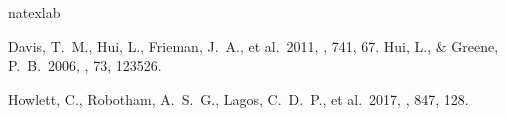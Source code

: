 \documentclass{aastex62}   	%
\begin{document}
\begin{thebibliography}{}
\expandafter\ifx\csname natexlab\endcsname\relax\def\natexlab#1{#1}\fi
\providecommand{\url}[1]{\href{#1}{#1}}
\providecommand{\dodoi}[1]{doi:~\href{http://doi.org/#1}{\nolinkurl{#1}}}
\providecommand{\doeprint}[1]{\href{http://ascl.net/#1}{\nolinkurl{http://ascl.net/#1}}}
\providecommand{\doarXiv}[1]{\href{https://arxiv.org/abs/#1}{\nolinkurl{https://arxiv.org/abs/#1}}}

 Davis, T.~M., Hui, L., Frieman, J.~A., et al.\ 2011, \apj, 741, 67.  
 Hui, L., \& Greene, P.~B.\ 2006, \prd, 73, 123526.
  
 Howlett, C., Robotham, A.~S.~G., Lagos, C.~D.~P., et al.\ 2017, \apj, 847, 128.
\end{thebibliography}

\end{document}
